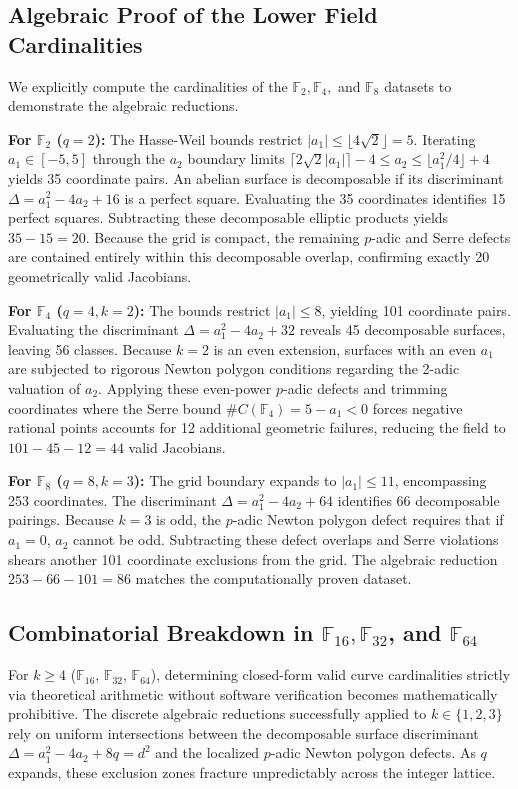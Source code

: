 \documentclass[12pt]{article}
\begin{document}
\subsection{Algebraic Proof of the Lower Field Cardinalities}
We explicitly compute the cardinalities of the $\mathbb{F}_2, \mathbb{F}_4,$ and $\mathbb{F}_8$ datasets to demonstrate the algebraic reductions.

\textbf{For $\mathbb{F}_2$ ($q=2$):}
The Hasse-Weil bounds restrict $|a_1| \le \lfloor 4\sqrt{2} \rfloor = 5$. Iterating $a_1 \in [-5, 5]$ through the $a_2$ boundary limits $\lceil 2\sqrt{2}|a_1| \rceil - 4 \le a_2 \le \lfloor a_1^2/4 \rfloor + 4$ yields 35 coordinate pairs. An abelian surface is decomposable if its discriminant $\Delta = a_1^2 - 4a_2 + 16$ is a perfect square. Evaluating the 35 coordinates identifies 15 perfect squares. Subtracting these decomposable elliptic products yields $35 - 15 = 20$. Because the grid is compact, the remaining $p$-adic and Serre defects are contained entirely within this decomposable overlap, confirming exactly 20 geometrically valid Jacobians.

\textbf{For $\mathbb{F}_4$ ($q=4, k=2$):}
The bounds restrict $|a_1| \le 8$, yielding 101 coordinate pairs. Evaluating the discriminant $\Delta = a_1^2 - 4a_2 + 32$ reveals 45 decomposable surfaces, leaving 56 classes. Because $k=2$ is an even extension, surfaces with an even $a_1$ are subjected to rigorous Newton polygon conditions regarding the 2-adic valuation of $a_2$. Applying these even-power $p$-adic defects and trimming coordinates where the Serre bound $\#C(\mathbb{F}_4) = 5 - a_1 < 0$ forces negative rational points accounts for 12 additional geometric failures, reducing the field to $101 - 45 - 12 = 44$ valid Jacobians.

\textbf{For $\mathbb{F}_8$ ($q=8, k=3$):}
The grid boundary expands to $|a_1| \le 11$, encompassing 253 coordinates. The discriminant $\Delta = a_1^2 - 4a_2 + 64$ identifies 66 decomposable pairings. Because $k=3$ is odd, the $p$-adic Newton polygon defect requires that if $a_1 = 0$, $a_2$ cannot be odd. Subtracting these defect overlaps and Serre violations shears another 101 coordinate exclusions from the grid. The algebraic reduction $253 - 66 - 101 = 86$ matches the computationally proven dataset.

\subsection{Combinatorial Breakdown in $\mathbb{F}_{16}, \mathbb{F}_{32}$, and $\mathbb{F}_{64}$}
For $k \ge 4$ ($\mathbb{F}_{16}$, $\mathbb{F}_{32}$, $\mathbb{F}_{64}$), determining closed-form valid curve cardinalities strictly via theoretical arithmetic without software verification becomes mathematically prohibitive. The discrete algebraic reductions successfully applied to $k \in \{1, 2, 3\}$ rely on uniform intersections between the decomposable surface discriminant $\Delta = a_1^2 - 4a_2 + 8q = d^2$ and the localized $p$-adic Newton polygon defects. As $q$ expands, these exclusion zones fracture unpredictably across the integer lattice. 
\end{document}
